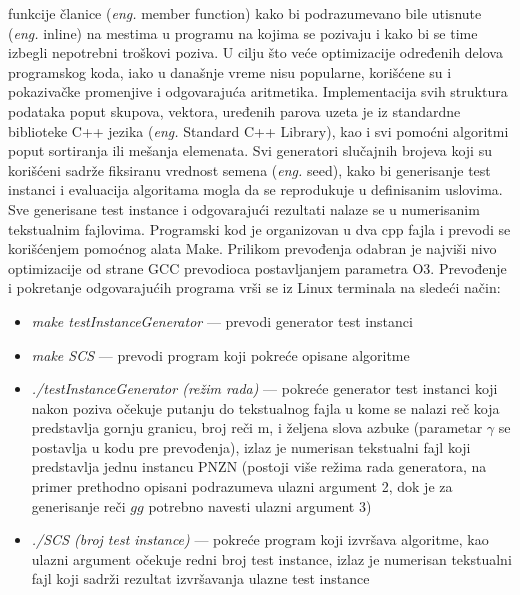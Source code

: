 \documentclass[12pt,oneside]{memoir}
\begin{document}
funkcije članice (\textit{eng.} member function) kako bi podrazumevano bile
utisnute (\textit{eng.} inline) na mestima u programu na kojima se pozivaju i kako
bi se time izbegli nepotrebni troškovi poziva. U cilju što veće optimizacije
određenih delova programskog koda, iako u današnje vreme nisu popularne,
korišćene su i pokazivačke promenjive i odgovarajuća aritmetika. 
Implementacija svih struktura podataka poput skupova, vektora, uređenih parova
uzeta je iz standardne biblioteke C++ jezika (\textit{eng.} Standard C++ Library), kao i svi
pomoćni algoritmi poput sortiranja ili mešanja elemenata.
Svi generatori slučajnih brojeva koji su korišćeni sadrže fiksiranu
vrednost semena (\textit{eng.} seed), kako bi generisanje test instanci
i evaluacija algoritama mogla da se reprodukuje u definisanim uslovima.
Sve generisane test instance i odgovarajući rezultati nalaze se u numerisanim tekstualnim fajlovima.
Programski kod je organizovan u dva cpp fajla i prevodi se korišćenjem
pomoćnog alata Make. Prilikom prevođenja odabran je najviši nivo
optimizacije od strane GCC prevodioca postavljanjem parametra O3.
Prevođenje i pokretanje odgovarajućih programa vrši se
iz Linux terminala na sledeći način:
\begin{itemize}
  \item \textit{make testInstanceGenerator} — prevodi generator test instanci
  \item \textit{make SCS} — prevodi program koji pokreće opisane algoritme
  \item \textit{./testInstanceGenerator (režim rada)} — pokreće generator test instanci koji nakon poziva 
  očekuje putanju do tekstualnog fajla u kome se nalazi reč koja predstavlja gornju granicu,
  broj reči m, i željena slova azbuke (parametar $\gamma$ se postavlja u kodu pre prevođenja),
  izlaz je numerisan tekstualni fajl koji predstavlja jednu instancu PNZN (postoji više 
  režima rada generatora, na primer prethodno opisani podrazumeva ulazni argument 2, dok je za generisanje
  reči $gg$ potrebno navesti ulazni argument 3)
  \item \textit{./SCS (broj test instance)} — pokreće program koji izvršava algoritme,
  kao ulazni argument očekuje redni broj test instance, izlaz je numerisan tekstualni fajl
  koji sadrži rezultat izvršavanja ulazne test instance
\end{itemize}
\end{document}
